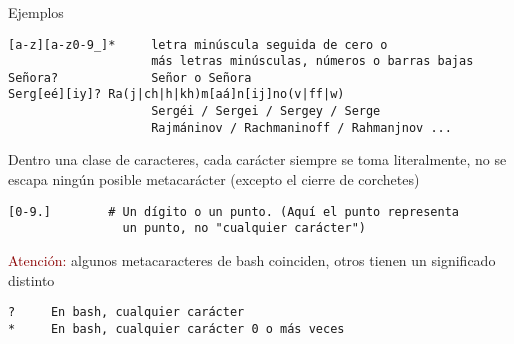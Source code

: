 \documentclass[ucs]{beamer}
\newcommand{\res}[1]{\textcolor{darkred}{#1}}
\begin{document}
\begin{frame}[fragile]
\frametitle{}
Ejemplos 
  \begin{footnotesize}
  \begin{verbatim}
[a-z][a-z0-9_]*     letra minúscula seguida de cero o
                    más letras minúsculas, números o barras bajas 
Señora?             Señor o Señora
Serg[eé][iy]? Ra(j|ch|h|kh)m[aá]n[ij]no(v|ff|w)
                    Sergéi / Sergei / Sergey / Serge
                    Rajmáninov / Rachmaninoff / Rahmanjnov ...
  \end{verbatim}
  \end{footnotesize}

Dentro una clase de caracteres, cada carácter siempre se toma
literalmente, no se escapa ningún posible metacarácter (excepto
el cierre de corchetes)

  \begin{footnotesize}
  \begin{verbatim}
[0-9.]        # Un dígito o un punto. (Aquí el punto representa 
                un punto, no "cualquier carácter")
  \end{verbatim}
  \end{footnotesize}


\res{Atención:} algunos metacaracteres de bash 
coinciden, otros
tienen un significado distinto
  \begin{footnotesize}
  \begin{verbatim}
?     En bash, cualquier carácter
*     En bash, cualquier carácter 0 o más veces 
  \end{verbatim}
  \end{footnotesize}

\end{frame}
\end{document}
